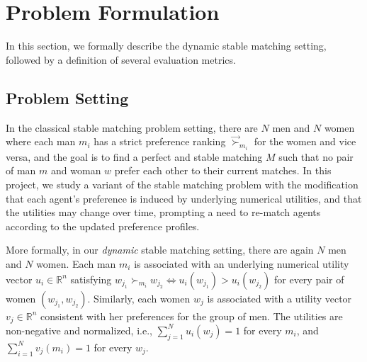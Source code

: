 \section{Problem Formulation}
In this section, we formally describe the dynamic stable matching setting, followed by a definition of several evaluation metrics.
\subsection{Problem Setting}
In the classical stable matching problem setting, there are $N$ men and $N$ women where each man $m_i$ has a strict preference ranking $\overrightarrow{\succ}_{m_i}$ for the women and vice versa, and the goal is to find a perfect and stable matching $M$ such that no pair of man $m$ and woman $w$ prefer each other to their current matches. In this project, we study a variant of the stable matching problem with the modification that each agent's preference is induced by underlying numerical utilities, and that the utilities may change over time, prompting a need to re-match agents according to the updated preference profiles.

More formally, in our \textit{dynamic} stable matching setting, there are again $N$ men and $N$ women. Each man $m_i$ is associated with an underlying numerical utility vector $u_i \in \mathbb{R}^n$ satisfying $w_{j_1} \succ_{m_i} w_{j_2} \Leftrightarrow u_i(w_{j_1}) > u_i(w_{j_2})$ for every pair of women $(w_{j_1}, w_{j_2})$. Similarly, each women $w_j$ is associated with a utility vector $v_j \in \mathbb{R}^n$ consistent with her preferences for the group of men. The utilities are non-negative and normalized, i.e., $\sum_{j=1}^N{u_i(w_j)} = 1$ for every $m_i$, and $\sum_{i=1}^N{v_j(m_i)} = 1$ for every $w_j$.

